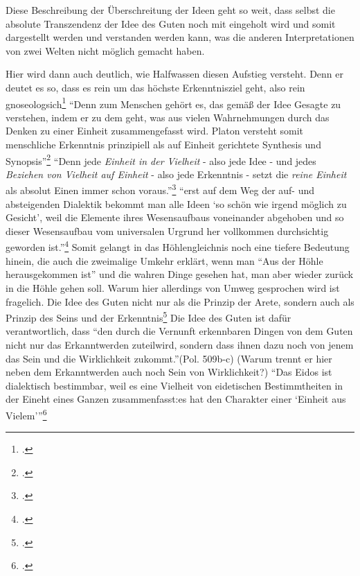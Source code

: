 Diese Beschreibung der Überschreitung der Ideen geht so weit, dass selbst die absolute Transzendenz der Idee des Guten noch mit eingeholt wird und somit dargestellt werden und verstanden werden kann, was die anderen Interpretationen von zwei Welten nicht möglich gemacht haben.

Hier wird dann auch deutlich, wie Halfwassen diesen Aufstieg versteht. Denn er deutet es so, dass es rein um das höchste Erkenntnisziel geht, also rein gnoseologsich\footcite[vgl.][S. 226]{halfwassenaufstieg2006}
\enquote{Denn zum Menschen gehört es, das gemäß der Idee Gesagte zu verstehen, indem er zu dem geht, was aus vielen Wahrnehmungen durch das Denken zu einer Einheit zusammengefasst wird. Platon versteht somit menschliche Erkenntnis prinzipiell als auf Einheit gerichtete Synthesis und Synopsis}\footcite[][S. 228]{halfwassenaufstieg2006}
\enquote{Denn jede \emph{Einheit in der Vielheit} - also jede Idee - und jedes \emph{Beziehen von Vielheit auf Einheit} - also jede Erkenntnis - setzt die \emph{reine Einheit} als absolut Einen immer schon voraus.}\footcite[][S. 230]{halfwassenaufstieg2006}
\enquote{erst auf dem Weg der auf- und absteigenden Dialektik bekommt man alle Ideen \enquote{so schön wie irgend möglich zu Gesicht}, weil die Elemente ihres Wesensaufbaus voneinander abgehoben und so dieser Wesensaufbau vom universalen Urgrund her vollkommen durchsichtig geworden ist.}\footcite[][S. 231]{halfwassenaufstieg2006}
Somit gelangt in das Höhlengleichnis noch eine tiefere Bedeutung hinein, die auch die zweimalige Umkehr erklärt, wenn man \enquote{Aus der Höhle herausgekommen ist} und die wahren Dinge gesehen hat, man aber wieder zurück in die Höhle gehen soll. Warum hier allerdings von Umweg gesprochen wird ist fragelich.
Die Idee des Guten nicht nur als die Prinzip der Arete, sondern auch als Prinzip des Seins und der Erkenntnis\footcite[vgl.][S. 238]{halfwassenaufstieg2006}
Die Idee des Guten ist dafür verantwortlich, dass \enquote{den durch die Vernunft erkennbaren Dingen von dem Guten nicht nur das Erkanntwerden zuteilwird, sondern dass ihnen dazu noch von jenem das Sein und die Wirklichkeit zukommt.}(Pol. 509b-c) (Warum trennt er hier neben dem Erkanntwerden auch noch Sein von Wirklichkeit?)
\enquote{Das Eidos ist dialektisch bestimmbar, weil es eine Vielheit von eidetischen Bestimmtheiten in der Eineht eines Ganzen zusammenfasst:es hat den Charakter einer \enquote{Einheit aus Vielem}}\footcite[][S. 240]{halfwassenaufstieg2006}
